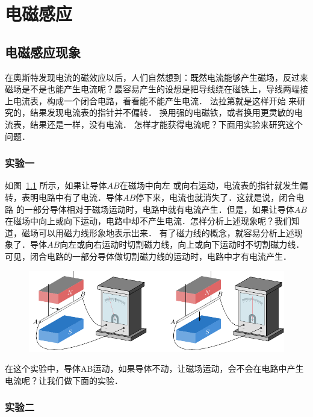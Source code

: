 \chapter{电磁感应}\label{chapter-electromagnetic-induction}

\section{电磁感应现象}

在奥斯特发现电流的磁效应以后，人们自然想到：既然电流能够产生磁场，反过来磁场是不是也能产生电流呢？最容易产生的设想是把导线绕在磁铁上，导线两端接上电流表，构成一个闭合电路，看看能不能产生电流．
法拉第就是这样开始
来研究的，结果发现电流表的指针并不偏转．
换用强的电磁铁，或者换用更灵敏的电流表，结果还是一样，没有电流．
怎样才能获得电流呢？下面用实验来研究这个问题．


\subsection*{实验一}
如图~\ref{fig_C_2-1} 所示，如果让导体$AB$在磁场中向左
或向右运动，电流表的指针就发生偏转，表明电路中有了电流．导体$AB$停下来，电流也就消失了．这就是说，闭合电路
的一部分导体相对于磁场运动时，电路中就有电流产生．但是，如果让导体$AB$在磁场中向上或向下运动，电路中却不产生电流．怎样分析上述现象呢？我们知道，磁场可以用磁力线形象地表示出来．
有了磁力线的概念，就容易分析上述现象了．导体$AB$向左或向右运动时切割磁力线，向上或向下运动时不切割磁力线．可见，闭合电路的一部分导体做切割磁力线的运动时，电路中才有电流产生．
\begin{figure}[htbp]
    \centering
    \includegraphics{fig/C/2-1.pdf}
    \caption{}\label{fig_C_2-1}
\end{figure}

在这个实验中，导体AB运动，如果导体不动，让磁场运动，会不会在电路中产生电流呢？让我们做下面的实验．

\subsection*{实验二}

